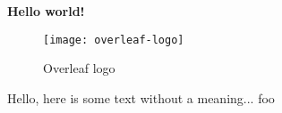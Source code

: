 \documentclass[../main.tex]{subfiles}
\begin{document}
\textbf{Hello world!}
\begin{figure}[bh]
\centering
\texttt{[image: overleaf-logo]}

\label{fig:img1}
\caption{Overleaf logo}
\end{figure}

Hello, here is some text without a meaning...
\cite{delilah}
\gls{foo}
\end{document}

